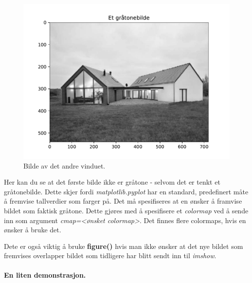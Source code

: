\documentclass[%
oneside,                 %
final,                   %
10pt]{article}
\begin{document}
\begin{figure}[!ht]  %
  \centerline{\includegraphics[width=0.9\linewidth]{Figure_2.pdf}}
  \caption{
  Bilde av det andre vinduet.
  }
\end{figure}


Her kan du se at det første bilde ikke er gråtone - selvom det er tenkt et gråtonebilde. Dette skjer fordi \emph{matplotlib.pyplot} har en standard, predefinert måte å fremvise tallverdier som farger på.
Det må spesifiseres at en ønsker å framvise bildet som faktisk gråtone. Dette gjøres med å spesifisere et \emph{colormap} ved å sende inn som argument \emph{cmap=<ønsket colormap>}. Det finnes flere colormaps, hvis en ønsker å bruke det.

Dete er også viktig å bruke \textbf{figure()} hvis man ikke ønsker at det nye bildet som fremvises overlapper bildet som tidligere har blitt sendt inn til \emph{imshow}.

\paragraph{En liten demonstrasjon.}
\label{subsec:demo}




\end{document}
